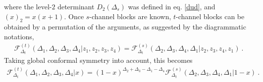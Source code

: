 \documentclass[12pt, a4paper, notitlepage, twoside]{report}
\numberwithin{equation}{section}
\theoremstyle{break}
\begin{document}
where the level-$2$ determinant $D_2(\Delta_s)$ was defined in eq. \eqref{dud}, and $(x)_2 = x(x+1)$.
Once $s$-channel blocks are known, $t$-channel blocks can be obtained by a permutation of the arguments, as suggested by the diagrammatic notations,
\begin{align}
 \mathcal{F}^{(t)}_{\Delta_t}(\Delta_1,\Delta_2,\Delta_3,\Delta_4|z_1,z_2,z_3,z_4) = \mathcal{F}^{(s)}_{\Delta_t}(\Delta_2,\Delta_3,\Delta_4,\Delta_1|z_2,z_3,z_4,z_1)\ . 
\label{gtgs}
\end{align}
Taking global conformal symmetry into account, this becomes
\begin{align}
 \mathcal{F}^{(t)}_{\Delta_t}(\Delta_1,\Delta_2,\Delta_3,\Delta_4|x) = (1-x)^{\Delta_2+\Delta_3-\Delta_1-\Delta_4}\mathcal{F}^{(s)}_{\Delta_t}(\Delta_2,\Delta_3,\Delta_4,\Delta_1|1-x)\ .
\end{align}
\end{document}
